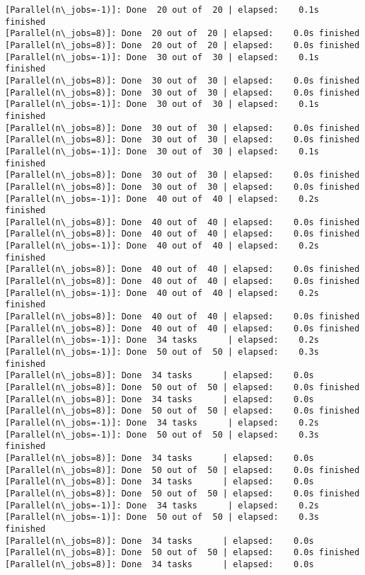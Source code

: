 \documentclass[11pt]{article}
\begin{document}
\begin{Verbatim}[commandchars=\\\{\}]
[Parallel(n\_jobs=-1)]: Done  20 out of  20 | elapsed:    0.1s finished
[Parallel(n\_jobs=8)]: Done  20 out of  20 | elapsed:    0.0s finished
[Parallel(n\_jobs=8)]: Done  20 out of  20 | elapsed:    0.0s finished
[Parallel(n\_jobs=-1)]: Done  30 out of  30 | elapsed:    0.1s finished
[Parallel(n\_jobs=8)]: Done  30 out of  30 | elapsed:    0.0s finished
[Parallel(n\_jobs=8)]: Done  30 out of  30 | elapsed:    0.0s finished
[Parallel(n\_jobs=-1)]: Done  30 out of  30 | elapsed:    0.1s finished
[Parallel(n\_jobs=8)]: Done  30 out of  30 | elapsed:    0.0s finished
[Parallel(n\_jobs=8)]: Done  30 out of  30 | elapsed:    0.0s finished
[Parallel(n\_jobs=-1)]: Done  30 out of  30 | elapsed:    0.1s finished
[Parallel(n\_jobs=8)]: Done  30 out of  30 | elapsed:    0.0s finished
[Parallel(n\_jobs=8)]: Done  30 out of  30 | elapsed:    0.0s finished
[Parallel(n\_jobs=-1)]: Done  40 out of  40 | elapsed:    0.2s finished
[Parallel(n\_jobs=8)]: Done  40 out of  40 | elapsed:    0.0s finished
[Parallel(n\_jobs=8)]: Done  40 out of  40 | elapsed:    0.0s finished
[Parallel(n\_jobs=-1)]: Done  40 out of  40 | elapsed:    0.2s finished
[Parallel(n\_jobs=8)]: Done  40 out of  40 | elapsed:    0.0s finished
[Parallel(n\_jobs=8)]: Done  40 out of  40 | elapsed:    0.0s finished
[Parallel(n\_jobs=-1)]: Done  40 out of  40 | elapsed:    0.2s finished
[Parallel(n\_jobs=8)]: Done  40 out of  40 | elapsed:    0.0s finished
[Parallel(n\_jobs=8)]: Done  40 out of  40 | elapsed:    0.0s finished
[Parallel(n\_jobs=-1)]: Done  34 tasks      | elapsed:    0.2s
[Parallel(n\_jobs=-1)]: Done  50 out of  50 | elapsed:    0.3s finished
[Parallel(n\_jobs=8)]: Done  34 tasks      | elapsed:    0.0s
[Parallel(n\_jobs=8)]: Done  50 out of  50 | elapsed:    0.0s finished
[Parallel(n\_jobs=8)]: Done  34 tasks      | elapsed:    0.0s
[Parallel(n\_jobs=8)]: Done  50 out of  50 | elapsed:    0.0s finished
[Parallel(n\_jobs=-1)]: Done  34 tasks      | elapsed:    0.2s
[Parallel(n\_jobs=-1)]: Done  50 out of  50 | elapsed:    0.3s finished
[Parallel(n\_jobs=8)]: Done  34 tasks      | elapsed:    0.0s
[Parallel(n\_jobs=8)]: Done  50 out of  50 | elapsed:    0.0s finished
[Parallel(n\_jobs=8)]: Done  34 tasks      | elapsed:    0.0s
[Parallel(n\_jobs=8)]: Done  50 out of  50 | elapsed:    0.0s finished
[Parallel(n\_jobs=-1)]: Done  34 tasks      | elapsed:    0.2s
[Parallel(n\_jobs=-1)]: Done  50 out of  50 | elapsed:    0.3s finished
[Parallel(n\_jobs=8)]: Done  34 tasks      | elapsed:    0.0s
[Parallel(n\_jobs=8)]: Done  50 out of  50 | elapsed:    0.0s finished
[Parallel(n\_jobs=8)]: Done  34 tasks      | elapsed:    0.0s

\end{Verbatim}
\end{document}
